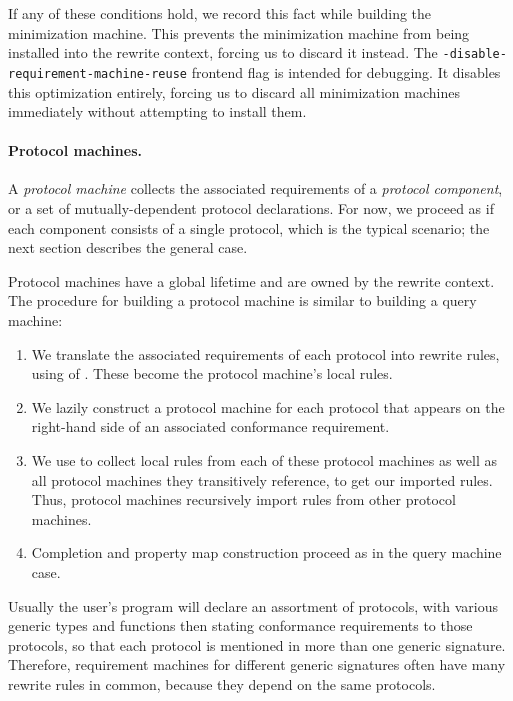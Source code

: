 \documentclass[../generics]{subfiles}
\begin{document}
If any of these conditions hold, we record this fact while building the minimization machine. This prevents the minimization machine from being installed into the rewrite context, forcing us to discard it instead. The \texttt{-disable-requirement-machine-reuse} frontend flag is intended for debugging. It disables this optimization entirely, forcing us to discard all minimization machines immediately without attempting to install them.

\paragraph{Protocol machines.}
A \emph{protocol machine} collects the associated requirements of a \emph{protocol component}, or a set of mutually-dependent protocol declarations. For now, we proceed as if each component consists of a single protocol, which is the typical scenario; the next section describes the general case.

Protocol machines have a global lifetime and are owned by the rewrite context. The procedure for building a protocol machine is similar to building a query machine:
\begin{enumerate}
\item We translate the associated requirements of each protocol into rewrite rules, using  of . These become the protocol machine's local rules.
\item We lazily construct a protocol machine for each protocol that appears on the right-hand side of an associated conformance requirement.
\item We use  to collect local rules from each of these protocol machines as well as all protocol machines they transitively reference, to get our imported rules. Thus, protocol machines recursively import rules from other protocol machines.
\item Completion and property map construction proceed as in the query machine case.
\end{enumerate}

Usually the user's program will declare an assortment of protocols, with various generic types and functions then stating conformance requirements to those protocols, so that each protocol is mentioned in more than one generic signature. Therefore, requirement machines for different generic signatures often have many rewrite rules in common, because they depend on the same protocols.
\end{document}
